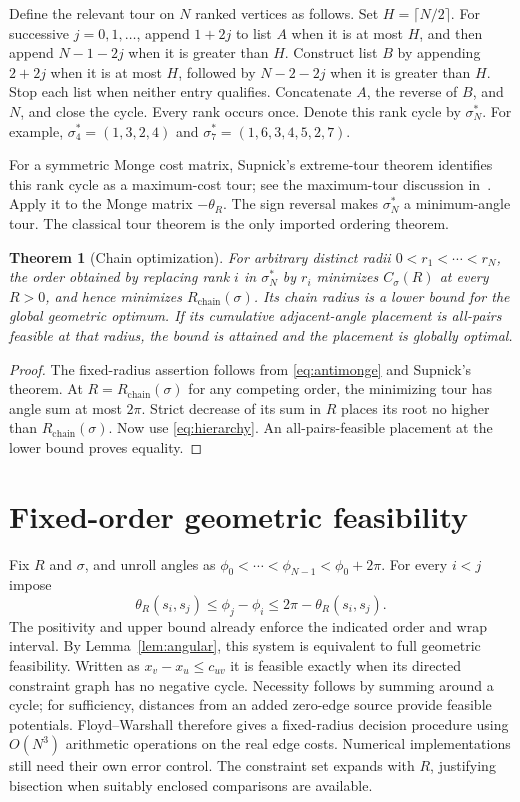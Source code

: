 \documentclass[11pt]{article}
\newtheorem{theorem}{Theorem}[section]
\theoremstyle{definition}
\theoremstyle{remark}
\newcommand{\Rchain}{R_{\mathrm{chain}}}
\begin{document}
Define the relevant tour on $N$ ranked vertices as follows.
Set $H=\lceil N/2\rceil$. For successive $j=0,1,\ldots$,
append $1+2j$ to list $A$ when it is at most $H$, and then append
$N-1-2j$ when it is greater than $H$. Construct list $B$ by appending
$2+2j$ when it is at most $H$, followed by $N-2-2j$ when it is greater
than $H$. Stop each list when neither entry qualifies. Concatenate
$A$, the reverse of $B$, and $N$, and close the cycle. Every rank occurs
once. Denote this rank cycle by $\sigma^*_N$. For example,
$\sigma^*_4=(1,3,2,4)$ and $\sigma^*_7=(1,6,3,4,5,2,7)$.

For a symmetric Monge cost matrix, Supnick's extreme-tour theorem
identifies this rank cycle as a maximum-cost tour; see the maximum-tour
discussion in~\cite{survey}. Apply it to the Monge matrix $-\theta_R$.
The sign reversal makes $\sigma^*_N$ a minimum-angle tour. The classical
tour theorem is the only imported ordering theorem.

\begin{theorem}[Chain optimization]\label{thm:chain}
For arbitrary distinct radii $0<r_1<\cdots<r_N$, the order obtained by
replacing rank $i$ in $\sigma^*_N$ by $r_i$ minimizes $C_\sigma(R)$
at every $R>0$, and hence minimizes $\Rchain(\sigma)$. Its chain
radius is a lower bound for the global geometric optimum. If its cumulative
adjacent-angle placement is all-pairs feasible at that radius, the bound
is attained and the placement is globally optimal.
\end{theorem}
\begin{proof}
The fixed-radius assertion follows from \eqref{eq:antimonge} and Supnick's
theorem. At $R=\Rchain(\sigma)$ for any competing order, the minimizing
tour has angle sum at most $2\pi$. Strict decrease of its sum in $R$
places its root no higher than $\Rchain(\sigma)$. Now use
\eqref{eq:hierarchy}. An all-pairs-feasible placement at the lower bound
proves equality.
\end{proof}

\section{Fixed-order geometric feasibility}\label{sec:fixed}
Fix $R$ and $\sigma$, and unroll angles as
$\phi_0<\cdots<\phi_{N-1}<\phi_0+2\pi$. For every $i<j$ impose
\begin{equation}\label{eq:difference}
 \theta_R(s_i,s_j)\le\phi_j-\phi_i
 \le2\pi-\theta_R(s_i,s_j).
\end{equation}
The positivity and upper bound already enforce the indicated order and
wrap interval. By Lemma~\ref{lem:angular}, this system is equivalent to
full geometric feasibility. Written as $x_v-x_u\le c_{uv}$ it is
feasible exactly when its directed constraint graph has no negative cycle.
Necessity follows by summing around a cycle; for sufficiency, distances
from an added zero-edge source provide feasible potentials. Floyd--Warshall
therefore gives a fixed-radius decision procedure using $O(N^3)$ arithmetic
operations on the real edge costs. Numerical implementations still need
their own error control. The constraint set expands with $R$, justifying
bisection when suitably enclosed comparisons are available.
\end{document}
